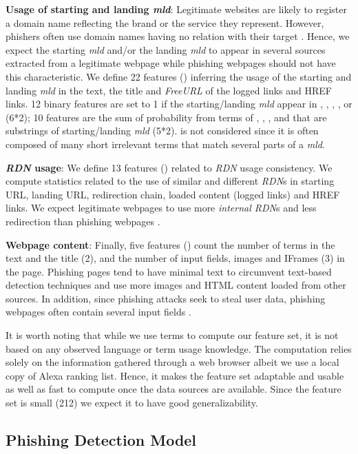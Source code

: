 \documentclass[10pt,conference,compsocconf,letterpaper]{IEEEtran}
\begin{document}
\fi

\noindent\textbf{Usage of starting and landing \textit{mld}}: Legitimate websites are likely to register a domain name reflecting the brand or the service they represent. However, phishers often use domain names having no relation with their target \cite{Xiang:2009:hybrid}. Hence, we expect the starting \textit{mld} and/or the landing \textit{mld} to appear in several sources extracted from a legitimate webpage while phishing webpages should not have this characteristic.  
We define 22 features () inferring the usage of the starting and landing \textit{mld} in the text, the title and \textit{FreeURL} of the logged links and HREF links. 
12 binary features are  set to 1 if the starting/landing \textit{mld} appear in , , , ,  or  (6*2); 10  features are the sum of probability from terms of , , ,  and   that are substrings of starting/landing \textit{mld} (5*2).  is not considered since it is often composed of many short irrelevant terms that match several parts of a \textit{mld}.

\noindent\textbf{\textit{RDN} usage}: We define 13 features () related to \textit{RDN} usage consistency. We compute statistics related to the use of similar and different \textit{RDN}s in starting URL, landing URL, redirection chain, loaded content (logged links) and HREF links. We expect legitimate webpages to use more \textit{internal RDN}s and less redirection than phishing webpages \cite{li:2014:hunting}. 

\noindent\textbf{Webpage content}: Finally, five features () count the number of terms in the text and the title (2), and the number of input fields, images and IFrames (3) in the page. Phishing pages tend to have minimal text to circumvent text-based detection techniques \cite{ramanathan:2013:phishing} and use more images and HTML content loaded from other sources. In addition, since phishing attacks seek to steal user data, phishing webpages often contain several input fields \cite{Xiang:2009:hybrid}.

It is worth noting that while we use terms to compute our feature set, it is not based on any observed language or term usage knowledge. The computation relies solely on the information gathered through a web browser albeit we use a local copy of Alexa ranking list. Hence, it makes the feature set adaptable and usable as well as fast to compute once the data sources are available. 
Since the feature set is small (212) we expect it to have good generalizability.


\subsection{Phishing Detection Model} 
\end{document}
